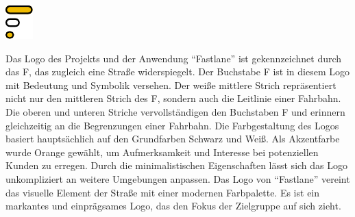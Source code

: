 {
        \centering
        \includegraphics[width =0.3 \textwidth]{pictures/fertiges_logo2}
}

\bigskip

Das Logo des Projekts und der Anwendung \enquote{Fastlane} ist gekennzeichnet durch das F, das zugleich eine Straße widerspiegelt.
Der Buchstabe F ist in diesem Logo mit Bedeutung und Symbolik versehen.
Der weiße mittlere Strich repräsentiert nicht nur den mittleren Strich des F, sondern auch die Leitlinie einer Fahrbahn.
Die oberen und unteren Striche vervollständigen den Buchstaben F und erinnern gleichzeitig an die Begrenzungen einer Fahrbahn.
Die Farbgestaltung des Logos basiert hauptsächlich auf den Grundfarben Schwarz und Weiß.
Als Akzentfarbe wurde Orange gewählt, um Aufmerksamkeit und Interesse bei potenziellen Kunden zu erregen.
Durch die minimalistischen Eigenschaften lässt sich das Logo unkompliziert an weitere Umgebungen anpassen.
Das Logo von \enquote{Fastlane} vereint das visuelle Element der Straße mit einer modernen Farbpalette.
Es ist ein markantes und einprägsames Logo, das den Fokus der Zielgruppe auf sich zieht.


